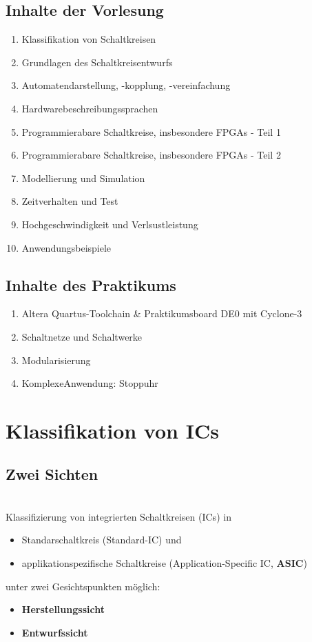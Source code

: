 \subsection{Inhalte der Vorlesung}
	\begin{enumerate}
		\item Klassifikation von Schaltkreisen
		\item Grundlagen des Schaltkreisentwurfs
		\item Automatendarstellung, -kopplung, -vereinfachung
		\item Hardwarebeschreibungssprachen
		\item Programmierabare Schaltkreise, insbesondere FPGAs - Teil 1
		\item Programmierabare Schaltkreise, insbesondere FPGAs - Teil 2
		\item Modellierung und Simulation
		\item Zeitverhalten und Test
		\item Hochgeschwindigkeit und Verlsustleistung
		\item Anwendungsbeispiele	
	\end{enumerate}

\subsection{Inhalte des Praktikums}
	\begin{enumerate}
		\item Altera Quartus-Toolchain \& Praktikumsboard DE0 mit Cyclone-3
		\item Schaltnetze und Schaltwerke
		\item Modularisierung
		\item \grqq Komplexe\grqq Anwendung: Stoppuhr
	\end{enumerate}


\section{Klassifikation von ICs}

\subsection{Zwei Sichten}
	\hfill\\Klassifizierung von integrierten Schaltkreisen (ICs) in
	\begin{itemize}
		\item Standarschaltkreis (Standard-IC) und
		\item applikationspezifische Schaltkreise (Application-Specific IC, \textbf{ASIC}) 
	\end{itemize}
	unter zwei Gesichtspunkten möglich:
	\begin{itemize}
		\item \textbf{Herstellungssicht}
		\item \textbf{Entwurfssicht}
	\end{itemize}

